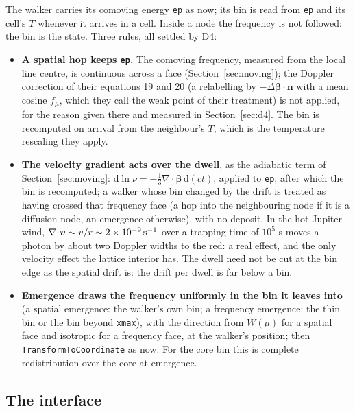 \documentclass[11pt]{article}
\newcommand{\key}[1]{\texttt{#1}}
\newcommand{\dd}{\mathrm{d}}
\begin{document}
The walker carries its comoving energy \texttt{ep} as now; its bin is read from
\texttt{ep} and its cell's $T$ whenever it arrives in a cell.  Inside a node the
frequency is not followed: the bin is the state.  Three rules, all settled by D4:
\begin{itemize}
\item \textbf{A spatial hop keeps \texttt{ep}.}  The comoving frequency, measured from
  the local line centre, is continuous across a face (Section~\ref{sec:moving}); the
  Doppler correction of their equations 19 and 20 (a relabelling by $-\Delta
  \boldsymbol{\beta}\cdot\boldsymbol{n}$ with a mean cosine $f_\mu$, which they call
  the weak point of their treatment) is not applied, for the reason given there and
  measured in Section~\ref{sec:d4}.  The bin is recomputed on arrival from the
  neighbour's $T$, which is the temperature rescaling they apply.
\item \textbf{The velocity gradient acts over the dwell}, as the adiabatic term of
  Section~\ref{sec:moving}: $\dd\ln\nu = -\tfrac13\nabla\!\cdot\!\boldsymbol{\beta}\,
  \dd(ct)$, applied to \texttt{ep}, after which the bin is recomputed; a walker whose
  bin changed by the drift is treated as having crossed that frequency face (a hop
  into the neighbouring node if it is a diffusion node, an emergence otherwise), with
  no deposit.  In the hot Jupiter wind, $\nabla\!\cdot\!\boldsymbol{v} \sim v/r \sim
  2\times10^{-9}\,{\rm s^{-1}}$ over a trapping time of $10^5$ s moves a photon by
  about two Doppler widths to the red: a real effect, and the only velocity effect the
  lattice interior has.  The dwell need not be cut at the bin edge as the spatial
  drift is: the drift per dwell is far below a bin.
\item \textbf{Emergence draws the frequency uniformly in the bin it leaves into} (a
  spatial emergence: the walker's own bin; a frequency emergence: the thin bin or the
  bin beyond \key{xmax}), with the direction from $W(\mu)$ for a spatial face and
  isotropic for a frequency face, at the walker's position; then
  \texttt{TransformToCoordinate} as now.  For the core bin this is complete
  redistribution over the core at emergence.
\end{itemize}

\subsection{The interface}
\end{document}
